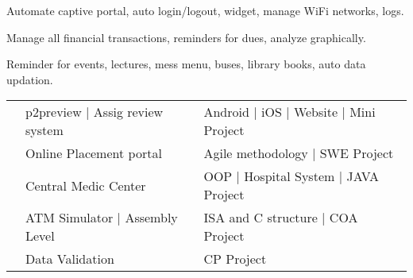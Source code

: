 \documentclass[a4paper]{deedy-resume} %
\begin{document}
\begin{minipage}[t]{0.66\textwidth}
    Automate captive portal, auto login/logout, widget, manage WiFi networks, logs.
    
    \sectionspace %
    
    
    Manage all financial transactions, reminders for dues, analyze graphically.
    
    \sectionspace %
    
    
    Reminder for events, lectures, mess menu, buses, library books, auto data updation.
    
    
    
    
    \sectionspace %
    
    
    \sectionspace %
    
    \begin{tabular}{rll}
    \textbullet{}    & p2preview | Assig review system & Android | iOS | Website | Mini Project\\
    \textbullet{}	 & Online Placement portal & Agile methodology | SWE Project\\
    \textbullet{}    & Central Medic Center & OOP | Hospital System | JAVA Project\\
    \textbullet{}	 & ATM Simulator | Assembly Level & ISA and C structure | COA Project\\
    \textbullet{}	 & Data Validation & CP Project\\
    \end{tabular}
    

\end{minipage}
\end{document}
